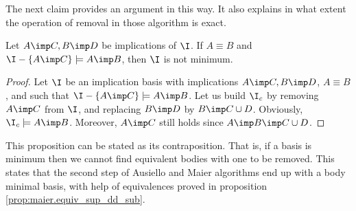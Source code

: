 \vspace{1.2em}

The next claim provides an argument in this way. It also explains in what 
extent the operation of removal in those algorithm is exact.

\begin{proposition} Let $A \imp C, B \imp D$ be implications of $\I$. If $A 
\equiv B$ and $\I - \{A \imp C \} \models A \imp B$, then $\I$ is not 
minimum.
	
\end{proposition}

\begin{proof} Let $\I$ be an implication basis with implications $A \imp C, B 
\imp D$, $A \equiv B$, and such that $\I - \{A \imp C \} \models A \imp B$. Let 
us build $\I_c$ by removing $A \imp C$ from $\I$, and replacing $B \imp D$ by 
$B \imp C \cup D$. Obviously, $\I_c \models A \imp B$. Moreover, $A \imp C$
still holds since $A \imp B \imp C \cup D$.
\end{proof}

\vspace{1.2em}

This proposition can be stated as its contraposition. That is, if a basis is
minimum then we cannot find equivalent bodies with one to be removed. This 
states that the second step of Ausiello and Maier algorithms end up with a 
body minimal basis, with help of equivalences proved in proposition 
\ref{prop:maier.equiv_sup_dd_sub}.














